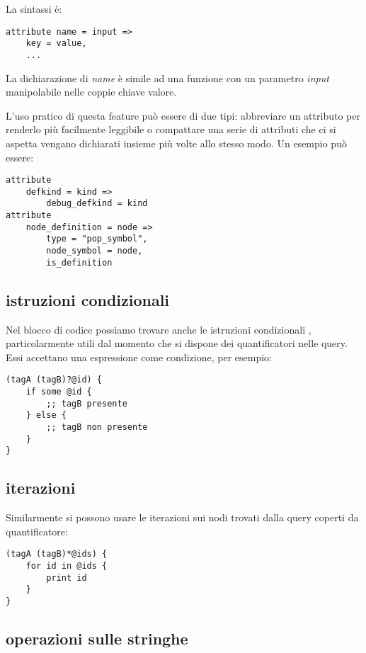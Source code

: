 La sintassi \`e:

\begin{lstlisting}
attribute name = input =>
    key = value,
    ...
\end{lstlisting}

La dichiarazione di \emph{name} \`e simile ad una funzione con un parametro \emph{input} manipolabile nelle coppie chiave valore.

L'uso pratico di questa feature pu\`o essere di due tipi: abbreviare un attributo per renderlo pi\`u facilmente leggibile o compattare una serie di attributi che ci si aspetta vengano dichiarati insieme pi\`u volte allo stesso modo. Un esempio pu\`o essere:

\begin{lstlisting}
attribute
    defkind = kind =>
        debug_defkind = kind
attribute
    node_definition = node =>
        type = "pop_symbol",
        node_symbol = node,
        is_definition
\end{lstlisting}

\subsection{istruzioni condizionali}

Nel blocco di codice possiamo trovare anche le istruzioni condizionali \cite{TreeSitterGraphReferenceConditionals}, particolarmente utili dal momento che si dispone dei quantificatori nelle query.
Essi accettano una espressione come condizione, per esempio:

\begin{lstlisting}
(tagA (tagB)?@id) {
    if some @id {
        ;; tagB presente
    } else {
        ;; tagB non presente
    }
}
\end{lstlisting}

\subsection{iterazioni}

Similarmente si possono usare le iterazioni \cite{TreeSitterGraphReferenceListIterations} sui nodi trovati dalla query coperti da quantificatore:

\begin{lstlisting}
(tagA (tagB)*@ids) {
    for id in @ids {
        print id
    }
}
\end{lstlisting}

\subsection{operazioni sulle stringhe}

